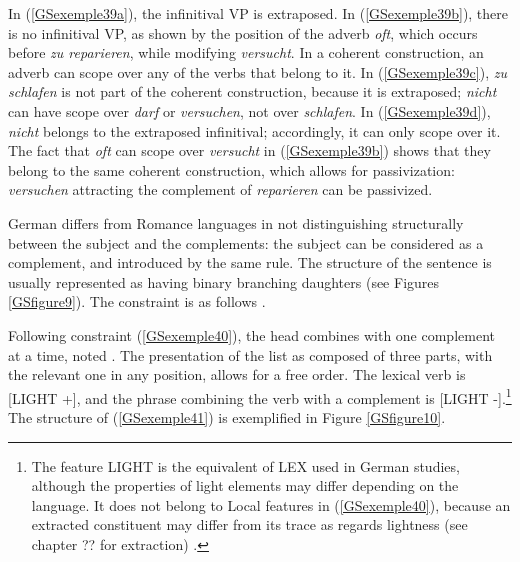 \documentclass[output=paper]{langsci/langscibook}
\begin{document}
{In (\ref{GSexemple39a}), the infinitival VP is extraposed. In (\ref{GSexemple39b}), there is no infinitival VP, as shown by the position of the adverb \textit{oft}, which occurs before \textit{zu reparieren}, while modifying \textit{versucht}. In a coherent construction, an adverb can scope over any of the verbs that belong to it. In (\ref{GSexemple39c}), \textit{zu schlafen} is not part of the coherent construction, because it is extraposed; \textit{nicht} can have scope over \textit{darf} or \textit{versuchen}, not over \textit{schlafen}. In (\ref{GSexemple39d}), \textit{nicht} belongs to the extraposed infinitival; accordingly, it can only scope over it. The fact that \textit{oft} can scope over \textit{versucht} in (\ref{GSexemple39b}) shows that they belong to the same coherent construction, which allows for passivization: \textit{versuchen} attracting the complement of \textit{reparieren} can be passivized.

German differs from Romance languages in not distinguishing structurally between the subject and the complements: the subject can be considered as a complement, and introduced by the same rule. The structure of the sentence is usually represented as having binary branching daughters (see Figures \ref{GSfigure9}). The constraint is as follows \citep{muller2018clause}.

\begin{exe}
\end{exe}

Following constraint (\ref{GSexemple40}), the head combines with one complement at a time, noted . The presentation of the list as composed of three parts, with the relevant one in any position, allows for a free order. The lexical verb is [LIGHT +], and the phrase combining the verb with a complement is [LIGHT -].\footnote{The feature LIGHT is the equivalent of LEX used in German studies, although the properties of light elements may differ depending on the language. It does not belong to Local features in (\ref{GSexemple40}), because an extracted constituent may differ from its trace as regards lightness (see chapter ?? for extraction) \citep{muller2018clause}.} The structure of (\ref{GSexemple41}) is exemplified in Figure \ref{GSfigure10}.

}
\end{document}
